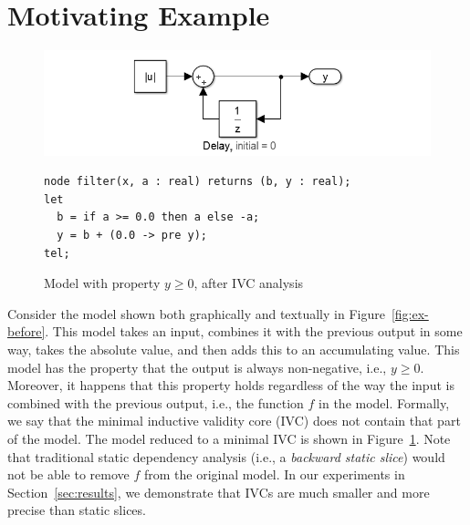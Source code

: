 \section{Motivating Example}
\label{sec:example}


\begin{figure}[t]
\includegraphics[width=\columnwidth]{figs/simulink-ivc.png}
{\small
\begin{verbatim}
node filter(x, a : real) returns (b, y : real);
let
  b = if a >= 0.0 then a else -a;
  y = b + (0.0 -> pre y);
tel;
\end{verbatim}
}
\vspace{-0.1in}
\caption{Model with property $y \geq 0$, after IVC analysis}
\label{fig:ex-after}
\end{figure}


Consider the model shown both graphically and textually in
Figure~\ref{fig:ex-before}. This model takes an input, combines it
with the previous output in some way, takes the absolute value, and
then adds this to an accumulating value. This model has the property
that the output is always non-negative, i.e., $y \geq 0$. Moreover, it
happens that this property holds regardless of the way the input is
combined with the previous output, i.e., the function $f$ in the
model. Formally, we say that the minimal inductive validity core (IVC) does
not contain that part of the model. The model reduced to a minimal IVC
is shown in Figure~\ref{fig:ex-after}. Note that traditional static
dependency analysis (i.e., a {\em backward static slice}) would not be able to
remove $f$ from the original model.  In our experiments in Section~\ref{sec:results},
we demonstrate that IVCs are much smaller and more precise than static slices.

